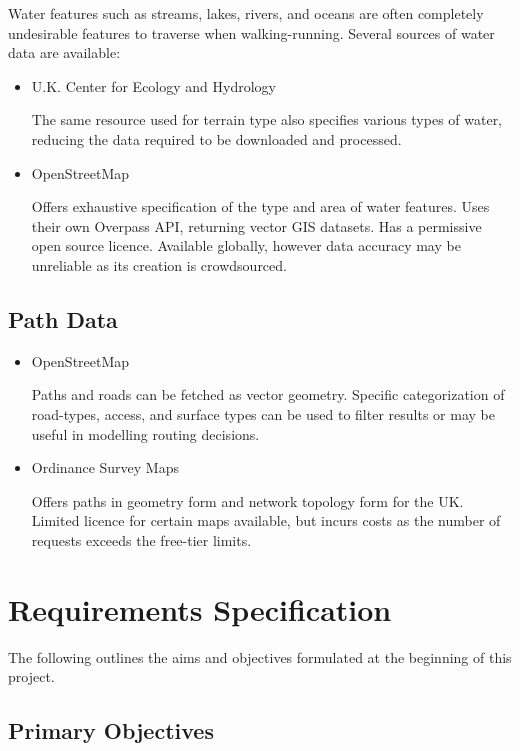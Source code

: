 \documentclass[12pt]{article}
\begin{document}
Water features such as streams, lakes, rivers, and oceans are often completely undesirable features to traverse when walking-running. Several sources of water data are available:

\begin{itemize}
  \item U.K. Center for Ecology and Hydrology

        The same resource used for terrain type also specifies various types of water, reducing the data required to be downloaded and processed.

  \item OpenStreetMap \autocite{wiki:osm}

        Offers exhaustive specification of the type and area of water features. Uses their own Overpass API, returning vector GIS datasets. Has a permissive open source licence. Available globally, however data accuracy may be unreliable as its creation is crowdsourced.

\end{itemize}

\subsection{Path Data}

\begin{itemize}
  \item OpenStreetMap \autocite{wiki:osm}

        Paths and roads can be fetched as vector geometry. Specific categorization of road-types, access, and surface types can be used to filter results or may be useful in modelling routing decisions.

  \item Ordinance Survey Maps

        Offers paths in geometry form and network topology form for the UK. Limited licence for certain maps available, but incurs costs as the number of requests exceeds the free-tier limits.

\end{itemize}

\section{Requirements Specification}

The following outlines the aims and objectives formulated at the beginning of this project.

\subsection{Primary Objectives}
\end{document}
